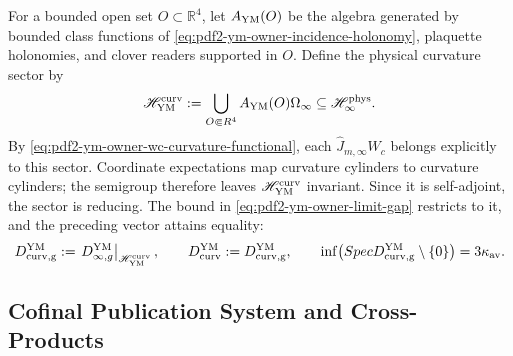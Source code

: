 For a bounded open set $O\subset\mathbb R^4$, let
$\mathfrak A_{\rm YM}(O)$ be the algebra generated by bounded class functions of
\eqref{eq:pdf2-ym-owner-incidence-holonomy}, plaquette holonomies, and clover
readers supported in $O$. Define the physical curvature sector by
\begin{equation}\label{eq:pdf2-ym-owner-curvature-cyclic-sector}
 \mathscr H_{\rm YM}^{\rm curv}
 :=\overline{\bigcup_{O\Subset\mathbb R^4}
   \mathfrak A_{\rm YM}(O)\Omega_\infty}
 \subseteq\widehat{\mathscr H}_\infty^{\rm phys}.
\end{equation}
By \eqref{eq:pdf2-ym-owner-wc-curvature-functional}, each
$\widehat J_{m,\infty}W_c$ belongs explicitly to this sector.
Coordinate expectations map curvature cylinders to curvature
cylinders; the semigroup therefore leaves
$\mathscr H_{\rm YM}^{\rm curv}$ invariant. Since it is self-adjoint, the sector is reducing. The
bound in \eqref{eq:pdf2-ym-owner-limit-gap} restricts to it, and the preceding vector
attains equality:
\begin{equation}\label{eq:pdf2-ym-owner-curvature-sector-gap}
 D_{\rm curv,g}^{\rm YM}
 :=\left.D_{\infty,g}^{\rm YM}\right|_{\mathscr H_{\rm YM}^{\rm curv}},
 \qquad D_{\rm curv}^{\rm YM}:=D_{\rm curv,g}^{\rm YM},
 \qquad
 \inf\bigl(\operatorname{Spec}D_{\rm curv,g}^{\rm YM}\setminus\{0\}\bigr)
 =3\kappa_{\rm av}.
\end{equation}

\subsection{Cofinal Publication System and Cross-Products}

